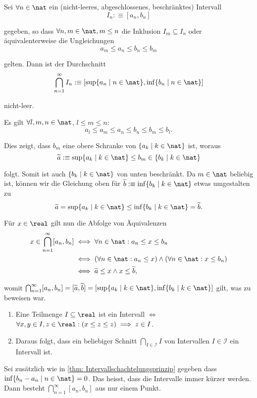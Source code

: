 \begin{thm}[Intervallschachtelungsprinzip]
  \label{thm: Intervallschachtelungsprinzip}
  Sei $\forall n \in \nat$ ein (nicht-leeres, abgeschlossenes, beschränktes) Intervall
  \[
    I_n :\equiv [a_n, b_n]
  \]

  gegeben, so dass $\forall n,m \in \nat, m \leq n$ die Inklusion $I_m \subseteq I_n$ oder äquivalenterweise die Ungleichungen
  \[
  a_m \leq a_n \leq b_n \leq b_m
  \]

  gelten.
  Dann ist der Durchschnitt
  \[
    \bigcap_{n=1}^{\infty}I_n :\equiv \left[ \sup\{ a_n \mid n \in \nat \}, \inf \{ b_n \mid n \in \nat \}\right]
  \]

  nicht-leer.
\end{thm}
\begin{prf}
  Es gilt $\forall l,m,n \in \nat$, $l \leq m \leq n$:
  \[
    a_l \leq a_m \leq a_n \leq b_n \leq b_m \leq b_l.
  \]

  Dies zeigt, dass $b_m$ eine obere Schranke von $\{a_k \mid k \in \nat \}$ ist, woraus
  \[
    \widetilde{a} :\equiv \sup \{ a_k \mid k \in \nat \} \leq b_m \in \{ b_k \mid k \in \nat \}
  \]

  folgt. Somit ist auch $\{ b_k \mid k \in \nat \}$ von unten beschränkt. Da $m \in \nat$ beliebig ist, können wir die Gleichung oben für $\widetilde{b} :\equiv \inf \{ b_k \mid k \in \nat \}$ etwas umgestalten zu
  \[
  \widetilde{a} = \sup \{ a_k \mid k \in \nat \} \leq \inf \{ b_k \mid k \in \nat \} = \widetilde{b}.
  \]

  Für $x \in \real$ gilt nun die Abfolge von Äquivalenzen
  \[
  \begin{aligned}
    x \in \bigcap_{n=1}^{\infty}[a_n, b_n]
    & \iff \forall n \in \nat: a_n \leq x \leq b_n \\
    & \iff (\forall n \in \nat: a_n \leq x) \wedge (\forall n \in \nat: x \leq b_n) \\
    & \iff \widetilde{a} \leq x \wedge x \leq \widetilde{b},
  \end{aligned}
  \]

  womit $\bigcap_{n=1}^{\infty}[a_n, b_n]=[\widetilde{a}, \widetilde{b}]=\left[ \sup\{ a_k \mid k \in \nat \}, \inf \{ b_k \mid k \in \nat \}\right]$ gilt, was zu beweisen war.
\end{prf}

\begin{ex}
  \phantom{.}
  \begin{enumerate}
    \item Eine Teilmenge $I \subseteq \real$ ist ein Intervall $\iff$ $\forall x,y \in I, z \in \real: (x \leq z \leq z) \implies z \in I$.
    \item Daraus folgt, dass ein beliebiger Schnitt $\bigcap_{I \in \mathcal{I}} I$ von Intervallen $I \in \mathcal{I}$ ein Intervall ist.
  \end{enumerate}
\end{ex}


\begin{ex}
  Sei zusätzlich wie in \ref{thm: Intervallschachtelungsprinzip} gegeben dass $\inf\{b_n-a_n \mid n \in \nat \} = 0$. Das heisst, dass die Intervalle immer kürzer werden. Dann besteht $\bigcap_{n=1}^{\infty}[a_n, b_n]$ aus nur einem Punkt.
\end{ex}

